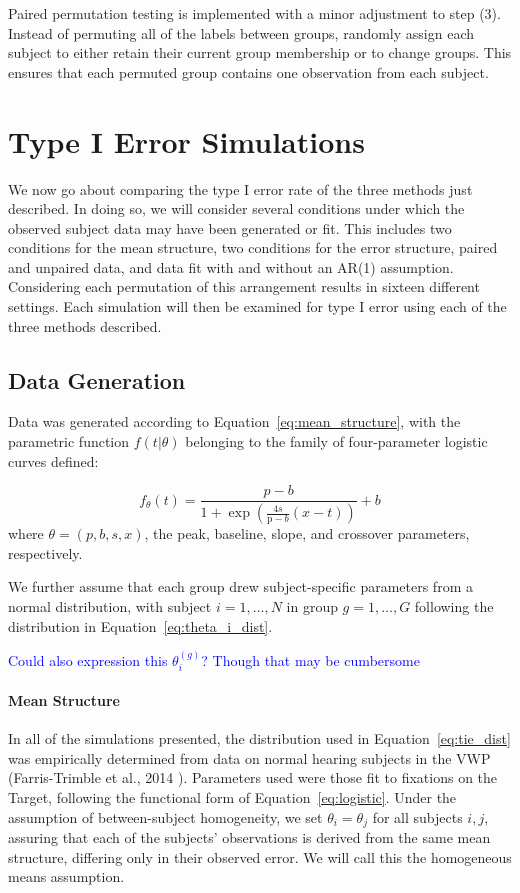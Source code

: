 \documentclass{article}
\providecommand{\cn}[1]{\textcolor{blue}{#1}}
\begin{document}
Paired permutation testing is implemented with a minor adjustment to step (3). Instead of permuting all of the labels between groups, randomly assign each subject to either retain their current group membership or to change groups. This ensures that each permuted group contains one observation from each subject.



\section{Type I Error Simulations}

We now go about comparing the type I error rate of the three methods just described. In doing so, we will consider several conditions under which the observed subject data may have been generated or fit. This includes two conditions for the mean structure, two conditions for the error structure, paired and unpaired data, and data fit with and without an AR(1) assumption. Considering each permutation of this arrangement results in sixteen different settings. Each simulation will then be examined for type I error using each of the three methods described.



\subsection{Data Generation}

Data was generated according to Equation~\ref{eq:mean_structure}, with the parametric function $f(t|\theta)$ belonging to the family of four-parameter logistic curves defined:

\begin{equation}\label{eq:logistic}
f_{\theta}(t) = \frac{p-b}{1 + \exp \left(\frac{4s}{\text{p}-b} (x - t) \right)} + b
\end{equation}
where $\theta = (p, b, s, x)$, the peak, baseline, slope, and crossover parameters, respectively.





We further assume that each group drew subject-specific parameters from a normal distribution, with subject $i = 1, \dots, N$ in group $g = 1, \dots, G$ following the distribution in Equation~\ref{eq:theta_i_dist}.

\cn{Could also expression this $\theta_i^{(g)}$? Though that may be cumbersome}

\paragraph{Mean Structure} In all of the simulations presented, the distribution used in Equation~\ref{eq:tie_dist} was empirically determined from data on normal hearing subjects in the VWP (Farris-Trimble et  al., 2014 \cite{FarrisTrimble2014}). Parameters used were those fit to fixations on the Target, following the functional form of Equation~\ref{eq:logistic}. Under the assumption of between-subject homogeneity, we set $\theta_i = \theta_j$ for all subjects $i,j$, assuring that each of the subjects' observations is derived from the same mean structure, differing only in their observed error. We will call this the homogeneous means assumption.
\end{document}
